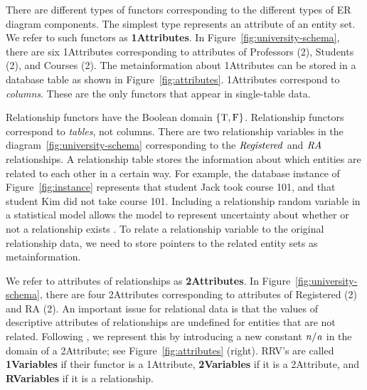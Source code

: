 \documentclass{acm_proc_article-sp}
\begin{document}
There are different types of functors corresponding to the different types of ER diagram components. The simplest type represents an attribute of an entity set. We refer to such functors as \textbf{1Attributes}. In Figure~\ref{fig:university-schema}, there are six 1Attributes corresponding to attributes of Professors (2), Students (2), and Courses (2). 
The metainformation about 1Attributes can be stored in a database table as shown in Figure~\ref{fig:attributes}. 
1Attributes correspond to {\em columns}. These are the only functors that appear in single-table data. 

Relationship functors have the Boolean domain $\{\mathrm{T},\mathrm{F}\}$. Relationship functors correspond to {\em tables}, not columns. There are two relationship variables in the diagram~\ref{fig:university-schema} corresponding to the $\it{Registered}$ and $\it{RA}$ relationships. A relationship table stores the information about which entities are related to each other in a certain way. For example, the database instance of Figure~\ref{fig:instance} represents that student Jack took course 101, and that student Kim did not take course 101.
 Including a relationship random variable in a statistical model allows the model to represent uncertainty about whether or not a relationship exists \cite{linkGetoor2003}. 
%
To relate a relationship variable to the original relationship data, we need to store pointers to the related entity sets as metainformation. 

We refer to attributes of relationships as \textbf{2Attributes}. In Figure~\ref{fig:university-schema}, there are four 2Attributes corresponding to attributes of Registered (2) and RA (2). An important issue for relational data is that the values of descriptive attributes of relationships are undefined for entities that are not related. Following \cite{Russell2010}, we represent this by introducing a new constant $\it{n/a}$ in the domain of a 2Attribute; see Figure~\ref{fig:attributes} (right). RRV's are called \textbf{1Variables} if their functor is a 1Attribute, \textbf{2Variables} if it is a 2Attribute, and \textbf{RVariables} if it is a relationship.
\end{document}
